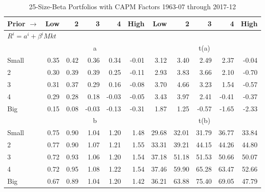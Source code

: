 
\begin{table}[!ht]
\footnotesize
\centering
\caption{25-Size-Beta Portfolios with CAPM Factors 1963-07 through 2017-12}
\begin{tabular}{lrrrrrrrrrr}
  \toprule
    Prior $\rightarrow$ & Low & 2 & 3 & 4 & High & Low & 2 & 3 & 4 & High \\ 
  \midrule
  \multicolumn{11}{l}{$R^i=a^i+\beta^iMkt$} \\

  
    
      & \multicolumn{5}{c}{a} & \multicolumn{5}{c}{t(a)}
    
    \\
      \cmidrule(r){2-6} \cmidrule(r){7-11}

    Small   & 0.35  & 0.42  & 0.36  & 0.34  & -0.01  & 3.12  & 3.40  & 2.49  & 2.37  & -0.04  \\
         2  & 0.30  & 0.39  & 0.39  & 0.25  & -0.11  & 2.93  & 3.83  & 3.66  & 2.10  & -0.70  \\
         3  & 0.31  & 0.37  & 0.29  & 0.16  & -0.08  & 3.70  & 4.66  & 3.23  & 1.54  & -0.57  \\
         4  & 0.29  & 0.28  & 0.18  & -0.03  & -0.05  & 3.43  & 3.97  & 2.41  & -0.41  & -0.37  \\
    Big     & 0.15  & 0.08  & -0.03  & -0.13  & -0.31  & 1.87  & 1.25  & -0.57  & -1.65  & -2.33  \\

  
    
      & \multicolumn{5}{c}{b} & \multicolumn{5}{c}{t(b)}
    
    \\
      \cmidrule(r){2-6} \cmidrule(r){7-11}

    Small   & 0.75  & 0.90  & 1.04  & 1.20  & 1.48  & 29.68  & 32.01  & 31.79  & 36.77  & 33.84  \\
         2  & 0.77  & 0.90  & 1.07  & 1.21  & 1.55  & 33.31  & 39.21  & 44.15  & 44.26  & 44.80  \\
         3  & 0.72  & 0.93  & 1.06  & 1.20  & 1.54  & 37.18  & 51.18  & 51.53  & 50.66  & 50.07  \\
         4  & 0.72  & 0.95  & 1.08  & 1.22  & 1.54  & 37.46  & 59.90  & 65.28  & 63.47  & 52.66  \\
    Big     & 0.67  & 0.89  & 1.04  & 1.20  & 1.42  & 36.21  & 63.88  & 75.40  & 69.05  & 47.79  \\

  

  \bottomrule
\end{tabular}
\label{tbl:25_Size_Beta_CAPM}
\end{table}